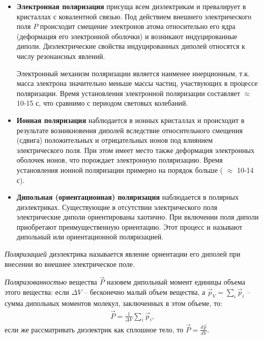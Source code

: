 \documentclass[__main__.tex]{subfiles}
\begin{document}
\begin{itemize}
\item
\textbf{Электронная поляризация} присуща всем диэлектрикам и превалирует в кристаллах с ковалентной связью. Под действием внешнего электрического поля $P$ происходит смещение электронов атома относительно его ядра (деформация его электронной оболочки) и возникают индуцированные диполи. Диэлектрические свойства индуцированных диполей относятся к числу резонансных явлений.

Электронный механизм поляризации является наименее инерционным, т.к. масса электрона значительно меньше массы частиц, участвующих в процессе поляризации. Время установления электронной поляризации составляет $\approx$ 10-15 с, что сравнимо с периодом световых колебаний.

\item
\textbf{Ионная поляризация} наблюдается в ионных кристаллах и происходит в результате возникновения диполей вследствие относительного смещения (сдвига) положительных и отрицательных ионов под влиянием электрического поля. При этом имеет место также деформация электронных оболочек ионов, что порождает электронную поляризацию. Время установления ионной поляризации примерно на порядок больше ( $\approx$ 10-14 с).

\item
\textbf{Дипольная (ориентационная) поляризация} наблюдается в полярных диэлектриках. Существующие в отсутствии электрического поля электрические диполи ориентированы хаотично. При включении поля диполи приобретают преимущественную ориентацию. Этот процесс и называют дипольный или ориентационной поляризацией.
\end{itemize}

\begin{definition}
	\emph{Поляризацией} диэлектрика называется явление ориентации его диполей при внесении во внешнее электрическое поле.
\end{definition}

\begin{definition}
	\emph{Поляризованностью} вещества $\vec{P}$ назовем дипольный момент единицы объема этого вещества: если $\Delta V$ -- бесконечно малый объем вещества, а $\vec{p}_V = \sum_{i}\vec{p}_i$ -- сумма дипольных моментов молекул, заключенных в этом объеме, то:
	\begin{gather}
		\vec{P} = \frac{1}{\Delta V}\sum_{i}\vec{p}_i,
	\end{gather}
	если же рассматривать диэлектрик как сплошное тело, то $\vec{P}=\frac{d\vec{p}}{dV}$.
\end{definition}
\end{document}
